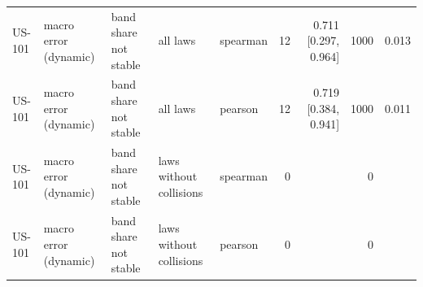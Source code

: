 \begin{table}[htbp]
{\begin{tabular}{lllllrrrr}
US-101 & macro error (dynamic) & band share not stable & all laws & spearman & 12 & 0.711 [0.297, 0.964] & 1000 & 0.013 \\
US-101 & macro error (dynamic) & band share not stable & all laws & pearson & 12 & 0.719 [0.384, 0.941] & 1000 & 0.011 \\
US-101 & macro error (dynamic) & band share not stable & laws without collisions & spearman & 0 &  & 0 &  \\
US-101 & macro error (dynamic) & band share not stable & laws without collisions & pearson & 0 &  & 0 &  \\
\bottomrule
\end{tabular}
}
\end{table}
